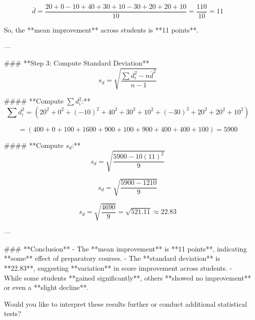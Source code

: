 \[
\bar{d} = \frac{20 + 0 - 10 + 40 + 30 + 10 - 30 + 20 + 20 + 10}{10} = \frac{110}{10} = 11
\]

So, the **mean improvement** across students is **11 points**.

---

### **Step 3: Compute Standard Deviation**
\[
s_d = \sqrt{ \frac{\sum d_i^2 - n\bar{d}^2}{n-1} }
\]

#### **Compute \( \sum d_i^2 \):**
\[
\sum d_i^2 = (20^2 + 0^2 + (-10)^2 + 40^2 + 30^2 + 10^2 + (-30)^2 + 20^2 + 20^2 + 10^2)
\]

\[
= (400 + 0 + 100 + 1600 + 900 + 100 + 900 + 400 + 400 + 100) = 5900
\]

#### **Compute \( s_d \):**
\[
s_d = \sqrt{ \frac{5900 - 10(11)^2}{9} }
\]

\[
s_d = \sqrt{ \frac{5900 - 1210}{9} }
\]

\[
s_d = \sqrt{ \frac{4690}{9} } = \sqrt{521.11} \approx 22.83
\]

---

### **Conclusion**
- The **mean improvement** is **11 points**, indicating **some** effect of preparatory courses.
- The **standard deviation** is **22.83**, suggesting **variation** in score improvement across students.
- While some students **gained significantly**, others **showed no improvement** or even a **slight decline**.

Would you like to interpret these results further or conduct additional statistical tests? 🚀
